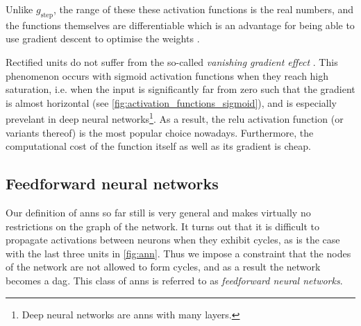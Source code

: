 \documentclass[../report.tex]{subfiles}
\begin{document}
Unlike $g_\text{step}$, the range of these these activation functions is the real numbers, and the functions themselves are differentiable which is an advantage for being able to use gradient descent to optimise the weights \cite[729]{russell2010}.

Rectified units do not suffer from the so-called \emph{vanishing gradient effect} \cite{glorot2011}.
This phenomenon occurs with sigmoid activation functions when they reach high saturation, i.e. when the input is significantly far from zero such that the gradient is almost horizontal (see \cref{fig:activation_functions_sigmoid}), and is especially prevelant in deep neural networks\footnote{Deep neural networks are \glspl{ann} with many layers.}.
As a result, the \gls{relu} activation function (or variants thereof) is the most popular choice nowadays.
Furthermore, the computational cost of the function itself as well as its gradient is cheap.

\subsection{Feedforward neural networks}
Our definition of \glspl{ann} so far still is very general and makes virtually no restrictions on the graph of the network.
It turns out that it is difficult to propagate activations between neurons when they exhibit cycles, as is the case with the last three units in \cref{fig:ann}.
Thus we impose a constraint that the nodes of the network are not allowed to form cycles, and as a result the network becomes a \gls{dag}.
This class of \glspl{ann} is referred to as \emph{feedforward neural networks}.
\end{document}
